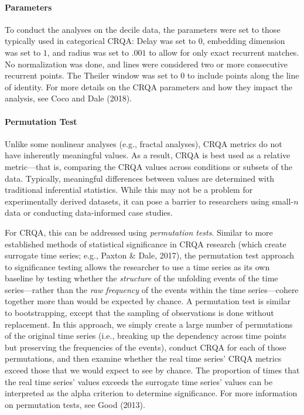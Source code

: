\documentclass[
  english,
  man]{apa6}
\let\oldparagraph\paragraph
\renewcommand{\paragraph}[1]{\oldparagraph{#1}\mbox{}}
\begin{document}
\hypertarget{parameters}{%
\paragraph{Parameters}\label{parameters}}

To conduct the analyses on the decile data, the parameters were set to those
typically used in categorical CRQA: Delay was set to \(0\), embedding dimension
was set to \(1\), and radius was set to \(.001\) to allow for only exact recurrent
matches. No normalization was done, and lines were considered two or more
consecutive recurrent points. The Theiler window was set to \(0\) to include
points along the line of identity. For more details on the CRQA parameters and
how they impact the analysis, see Coco and Dale (2018).

\hypertarget{permutation-test}{%
\paragraph{Permutation Test}\label{permutation-test}}

Unlike some nonlinear analyses (e.g., fractal analyses), CRQA metrics do not
have inherently meaningful values. As a result, CRQA is best used as a relative
metric---that is, comparing the CRQA values across conditions or subsets of the
data. Typically, meaningful differences between values are determined with
traditional inferential statistics. While this may not be a problem for
experimentally derived datasets, it can pose a barrier to researchers using
small-\(n\) data or conducting data-informed case studies.

For CRQA, this can be addressed using \emph{permutation tests}. Similar to more
established methods of statistical significance in CRQA research (which create
surrogate time series; e.g., Paxton \& Dale, 2017), the permutation test
approach to significance testing allows the researcher to use a time series as
its own baseline by testing whether the \emph{structure} of the unfolding events of
the time series---rather than the \emph{raw frequency} of the events within the time
series---cohere together more than would be expected by chance. A permutation
test is similar to bootstrapping, except that the sampling of observations is
done without replacement. In this approach, we simply create a large number of
permutations of the original time series (i.e., breaking up the dependency
across time points but preserving the frequencies of the events), conduct CRQA
for each of those permutations, and then examine whether the real time series'
CRQA metrics exceed those that we would expect to see by chance. The proportion
of times that the real time series' values exceeds the surrogate time series'
values can be interpreted as the alpha criterion to determine significance. For
more information on permutation tests, see Good (2013).
\end{document}
